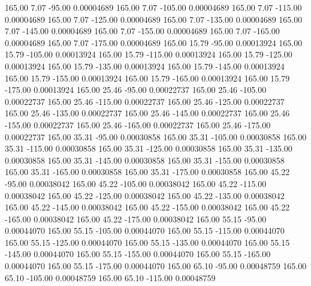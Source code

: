     165.00      7.07    -95.00     0.00004689
    165.00      7.07   -105.00     0.00004689
    165.00      7.07   -115.00     0.00004689
    165.00      7.07   -125.00     0.00004689
    165.00      7.07   -135.00     0.00004689
    165.00      7.07   -145.00     0.00004689
    165.00      7.07   -155.00     0.00004689
    165.00      7.07   -165.00     0.00004689
    165.00      7.07   -175.00     0.00004689
    165.00     15.79    -95.00     0.00013924
    165.00     15.79   -105.00     0.00013924
    165.00     15.79   -115.00     0.00013924
    165.00     15.79   -125.00     0.00013924
    165.00     15.79   -135.00     0.00013924
    165.00     15.79   -145.00     0.00013924
    165.00     15.79   -155.00     0.00013924
    165.00     15.79   -165.00     0.00013924
    165.00     15.79   -175.00     0.00013924
    165.00     25.46    -95.00     0.00022737
    165.00     25.46   -105.00     0.00022737
    165.00     25.46   -115.00     0.00022737
    165.00     25.46   -125.00     0.00022737
    165.00     25.46   -135.00     0.00022737
    165.00     25.46   -145.00     0.00022737
    165.00     25.46   -155.00     0.00022737
    165.00     25.46   -165.00     0.00022737
    165.00     25.46   -175.00     0.00022737
    165.00     35.31    -95.00     0.00030858
    165.00     35.31   -105.00     0.00030858
    165.00     35.31   -115.00     0.00030858
    165.00     35.31   -125.00     0.00030858
    165.00     35.31   -135.00     0.00030858
    165.00     35.31   -145.00     0.00030858
    165.00     35.31   -155.00     0.00030858
    165.00     35.31   -165.00     0.00030858
    165.00     35.31   -175.00     0.00030858
    165.00     45.22    -95.00     0.00038042
    165.00     45.22   -105.00     0.00038042
    165.00     45.22   -115.00     0.00038042
    165.00     45.22   -125.00     0.00038042
    165.00     45.22   -135.00     0.00038042
    165.00     45.22   -145.00     0.00038042
    165.00     45.22   -155.00     0.00038042
    165.00     45.22   -165.00     0.00038042
    165.00     45.22   -175.00     0.00038042
    165.00     55.15    -95.00     0.00044070
    165.00     55.15   -105.00     0.00044070
    165.00     55.15   -115.00     0.00044070
    165.00     55.15   -125.00     0.00044070
    165.00     55.15   -135.00     0.00044070
    165.00     55.15   -145.00     0.00044070
    165.00     55.15   -155.00     0.00044070
    165.00     55.15   -165.00     0.00044070
    165.00     55.15   -175.00     0.00044070
    165.00     65.10    -95.00     0.00048759
    165.00     65.10   -105.00     0.00048759
    165.00     65.10   -115.00     0.00048759
